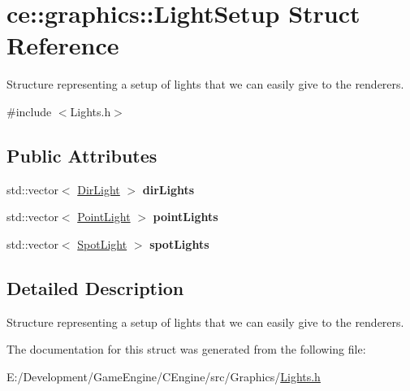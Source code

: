 \hypertarget{structce_1_1graphics_1_1_light_setup}{}\section{ce\+:\+:graphics\+:\+:Light\+Setup Struct Reference}
\label{structce_1_1graphics_1_1_light_setup}


Structure representing a setup of lights that we can easily give to the renderers.  




{\ttfamily \#include $<$Lights.\+h$>$}

\subsection*{Public Attributes}
\begin{DoxyCompactItemize}
\item 
\mbox{\label{structce_1_1graphics_1_1_light_setup_a244f07e42597b634054c7c1b7733054d}} 
std\+::vector$<$ \hyperlink{classce_1_1graphics_1_1_dir_light}{Dir\+Light} $>$ {\bfseries dir\+Lights}
\item 
\mbox{\label{structce_1_1graphics_1_1_light_setup_aed06cdb1ef61afd4705c26ef1781637e}} 
std\+::vector$<$ \hyperlink{classce_1_1graphics_1_1_point_light}{Point\+Light} $>$ {\bfseries point\+Lights}
\item 
\mbox{\label{structce_1_1graphics_1_1_light_setup_a68944c5cb6b197a32fe5bfdd89e3ed4a}} 
std\+::vector$<$ \hyperlink{classce_1_1graphics_1_1_spot_light}{Spot\+Light} $>$ {\bfseries spot\+Lights}
\end{DoxyCompactItemize}


\subsection{Detailed Description}
Structure representing a setup of lights that we can easily give to the renderers. 

The documentation for this struct was generated from the following file\+:\begin{DoxyCompactItemize}
\item 
E\+:/\+Development/\+Game\+Engine/\+C\+Engine/src/\+Graphics/\hyperlink{_lights_8h}{Lights.\+h}\end{DoxyCompactItemize}
